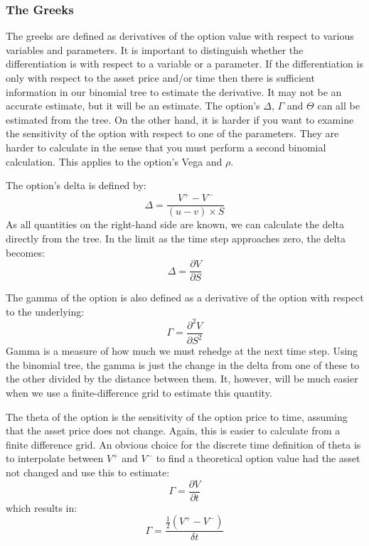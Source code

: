 \subsubsection{The Greeks}
The greeks are defined as derivatives of the option value with respect to various variables and parameters. It is important to distinguish whether the differentiation is with respect to a variable or a parameter. If the differentiation is only with
respect to the asset price and/or time then there is sufficient information in our binomial tree to estimate the derivative. It may not be an accurate estimate, but it will be an estimate. The option's $\Delta$, $\Gamma$ and $\Theta$ can all be estimated from the tree. On the other hand, it is harder if you want to examine the sensitivity of the option with respect to one of the parameters. They are harder to calculate in the sense that you must perform a second binomial calculation. This applies to the option's Vega and $\rho$.

The option's delta is defined by:
\begin{equation}
    \Delta = \frac{V^+ - V^-}{(u-v) \times S}
\end{equation}
As all quantities on the right-hand side are known, we can calculate the delta directly from the tree. In the limit as the time step approaches zero, the delta becomes:
\begin{equation}
    \Delta = \frac{\partial V}{\partial S}
\end{equation}

The gamma of the option is also defined as a derivative of the option with respect to the underlying:
\begin{equation}
    \Gamma = \frac{\partial^2 V}{\partial S^2}
\end{equation}
Gamma is a measure of how much we must rehedge at the next time step. Using the binomial tree, the gamma is just the change in the delta from one of these to the other divided by the distance between them. It, however, will be much easier when we use a finite-difference grid to estimate this quantity.

The theta of the option is the sensitivity of the option price to time, assuming that the asset price does not change. Again, this is easier to calculate from a finite difference grid. An obvious choice for the discrete time definition of theta is to interpolate between $V^+$ and $V^-$ to find a theoretical option value had the asset not changed and use this to estimate:
\begin{equation}
    \Gamma = \frac{\partial V}{\partial t}
\end{equation}
which results in:
\begin{equation}
    \Gamma = \frac{\frac{1}{2} \left( V^+ - V^- \right)}{\delta t}
\end{equation}

